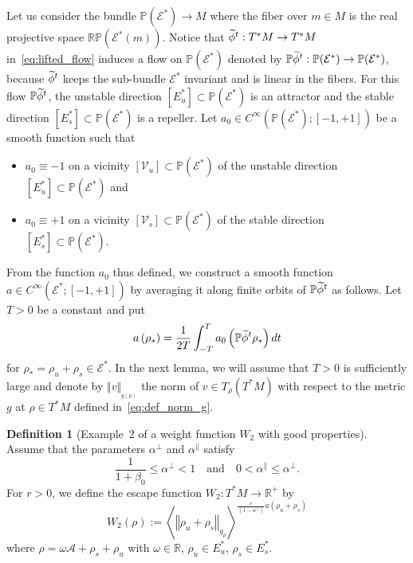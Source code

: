 \documentclass[10pt]{amsart}
\theoremstyle{definition}\newtheorem{defi}[theo]{Definition}\newtheorem{rema}[theo]{Remark}\newtheorem{exam}[theo]{Example}\newtheorem{exem}[theo]{Example}\newtheorem{nota}[theo]{Notation}
\newcommand{\clV}{\mathcal{V}}
\newcommand{\clE}{\mathcal{E}}
\newcommand{\bbR}{\mathbb{R}}
\newcommand{\bbP}{\mathbb{P}}
\newcommand{\bbRP}{\mathbb{RP}}
\newcommand{\scrA}{\mathscr{A}}
\let\oldtilde\tilde
\renewcommand*{\tilde}[1]{\mathchoice{\widetilde{#1}}{\widetilde{#1}}{\oldtilde{#1}}{\oldtilde{#1}}}
\begin{document}
Let us consider the bundle $\bbP(\clE^{*})\rightarrow M$ where the fiber over $m\in M$ is the real projective space $\bbRP(\clE^{*}(m))$. Notice that $\tilde{\phi}^{t}:T^{*}M\rightarrow T^{*}M$ in~\eqref{eq:lifted_flow} induces a flow on $\bbP(\clE^{*})$ denoted by $\bbP\tilde{\phi}^{t}:\bbP(\clE^{*})\to\bbP(\clE^{*})$, because $\tilde{\phi}^{t}$ keeps the sub-bundle $\clE^{*}$ invariant and is linear in the fibers. For this flow $\bbP\tilde{\phi}^{t}$, the unstable direction $[E_{u}^{*}]\subset\bbP(\clE^{*})$ is an attractor and the stable direction $[E_{s}^{*}]\subset\bbP(\clE^{*})$ is a repeller. Let $a_{0}\in C^{\infty}(\bbP(\clE^{*});[-1,+1])$ be a smooth function such that
\begin{itemize}
\item $a_{0}\equiv-1$ on a vicinity $[\clV_{u}]\subset\bbP(\clE^{*})$ of the unstable direction $[E_{u}^{*}]\subset\bbP(\clE^{*})$ and
\item $a_{0}\equiv+1$ on a vicinity $[\clV_{s}]\subset\bbP(\clE^{*})$ of the stable direction $[E_{s}^{*}]\subset\bbP(\clE^{*})$.
\end{itemize}
From the function $a_{0}$ thus defined, we construct a smooth function $a\in C^{\infty}(\clE^{*};[-1,+1])$ by averaging it along finite orbits of $\bbP\tilde{\phi}^{t}$ as follows. Let $T>0$ be a constant and put
\begin{equation}\label{eq:def_a_T}
a\left(\rho_{*}\right)=\frac{1}{2T}\int_{-T}^{T}a_{0}\left(\bbP\tilde{\phi}^{t}\rho_{*}\right)dt
\end{equation}
for $\rho_{*}=\rho_{u}+\rho_{s}\in\clE^{*}$. In the next lemma, we will assume that $T>0$ is sufficiently large and denote by $\Vert v\Vert _{_{g(\rho)}}$ the norm of $v\in T_{\rho}(T^{*}M)$ with respect to the metric $g$ at $\rho\in T^{*}M$ defined in~\eqref{eq:def_norm_g}.

\begin{cBoxA}{}
\begin{defi}[Example~2 of a weight function $W_{2}$ with good properties]\label{lem:W1}
Assume that the parameters $\alpha^{\perp}$ and $\alpha^{\parallel}$ satisfy
\[
\frac{1}{1+\beta_{0}}\leq\alpha^{\perp}<1\quad\text{and}\quad0<\alpha^{\parallel}\leq\alpha^{\perp}.
\]
For $r>0$, we define the escape function $W_{2}:T^{*}M\rightarrow\bbR^{+}$ by
\begin{equation}\label{eq:def_W-1}
W_{2}\left(\rho\right):=\left\langle \left\Vert \rho_{u}+\rho_{s}\right\Vert _{g_{\rho}}\right\rangle ^{\frac{r}{\left(1-\alpha^{\perp}\right)}a\left(\rho_{u}+\rho_{s}\right)}
\end{equation}
where $\rho=\omega\scrA+\rho_{s}+\rho_{u}$ with $\omega\in\bbR$, $\rho_{u}\in E_{u}^{*}$, $\rho_{s}\in E_{s}^{*}$.
\end{defi}
\end{cBoxA}
\end{document}
